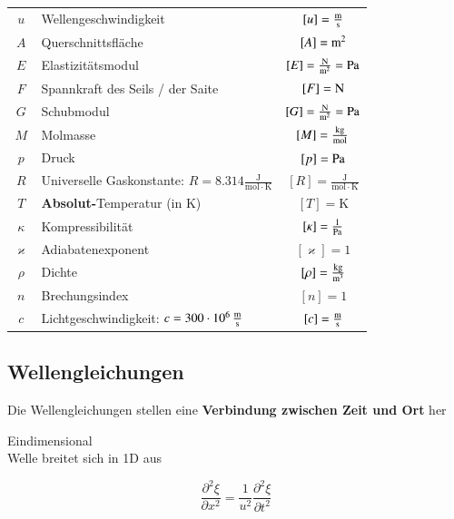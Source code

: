 \renewcommand{\arraystretch}{1.1}
\begin{tabular}{c l c}
$u$ & Wellengeschwindigkeit & $[u] = \frac{\mathrm{m}}{\mathrm{s}}$ \\
$A$ & Querschnittsfläche & $[A] = \mathrm{m}^2$ \\
$E$ & Elastizitätsmodul & $[E] = \frac{\mathrm{N}}{\mathrm{m}^2} = \mathrm{Pa}$\\
$F$ & Spannkraft des Seils / der Saite & $[F] = \mathrm{N}$ \\
$G$ & Schubmodul & $[G] = \frac{\mathrm{N}}{\mathrm{m}^2} = \mathrm{Pa}$ \\
$M$ & Molmasse & $[M] = \frac{\mathrm{kg}}{\mathrm{mol}}$ \\
$p$ & Druck & $[p] = \mathrm{Pa}$ \\
$R$ & Universelle Gaskonstante: $R = 8.314 \mathrm{\frac{J}{mol \cdot K}}$ & $[R] = \mathrm{\frac{J}{mol \cdot K}} $ \\
$T$ & \textbf{Absolut-}Temperatur (in K) & $[T] = \mathrm{K}$ \\
$\kappa$ & Kompressibilität & $[\kappa] = \frac{1}{\mathrm{Pa}}$ \\
$\varkappa$ & Adiabatenexponent & $[\varkappa] = 1$ \\
$\rho$ & Dichte & $[\rho] = \frac{\mathrm{kg}}{\mathrm{m}^3}$ \\
$n$ & Brechungsindex & $[n] = 1$ \\
$c$ & Lichtgeschwindigkeit: $c = 300 \cdot 10^6 \, \frac{\mathrm{m}}{\mathrm{s}}$ & $[c] = \frac{\mathrm{m}}{\mathrm{s}}$ \\
\end{tabular}
\renewcommand{\arraystretch}{1}



\subsection{Wellengleichungen}
Die Wellengleichungen stellen eine \textbf{Verbindung zwischen Zeit und Ort} her \\

\vspace{0.5cm}


\begin{minipage}{0.45\linewidth}
Eindimensional \\
Welle breitet sich in 1D aus \\
\end{minipage}
\hfill
\begin{minipage}{0.48\linewidth}
$$\boxed{ \frac{\partial^2 \xi}{\partial x^2} = \frac{1}{u^2} \frac{\partial^2 \xi}{\partial t^2}  }$$  \\
\end{minipage}


